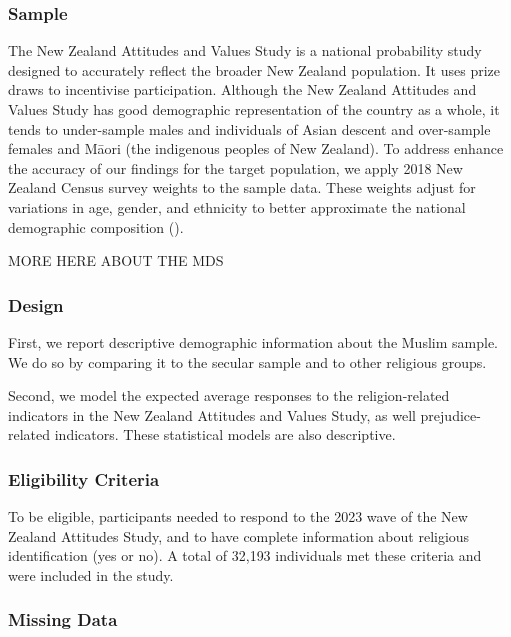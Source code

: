 \documentclass[
  single column]{article}
\begin{document}
\newpage{}

\subsubsection{Sample}\label{sample}

The New Zealand Attitudes and Values Study is a national probability
study designed to accurately reflect the broader New Zealand population.
It uses prize draws to incentivise participation. Although the New
Zealand Attitudes and Values Study has good demographic representation
of the country as a whole, it tends to under-sample males and
individuals of Asian descent and over-sample females and Māori (the
indigenous peoples of New Zealand). To address enhance the accuracy of
our findings for the target population, we apply 2018 New Zealand Census
survey weights to the sample data. These weights adjust for variations
in age, gender, and ethnicity to better approximate the national
demographic composition ().

MORE HERE ABOUT THE MDS

\subsubsection{Design}\label{design}

First, we report descriptive demographic information about the Muslim
sample. We do so by comparing it to the secular sample and to other
religious groups.

Second, we model the expected average responses to the religion-related
indicators in the New Zealand Attitudes and Values Study, as well
prejudice-related indicators. These statistical models are also
descriptive.

\subsubsection{Eligibility Criteria}\label{eligibility-criteria}

To be eligible, participants needed to respond to the 2023 wave of the
New Zealand Attitudes Study, and to have complete information about
religious identification (yes or no). A total of 32,193 individuals met
these criteria and were included in the study.

\subsubsection{Missing Data}\label{missing-data}
\end{document}
